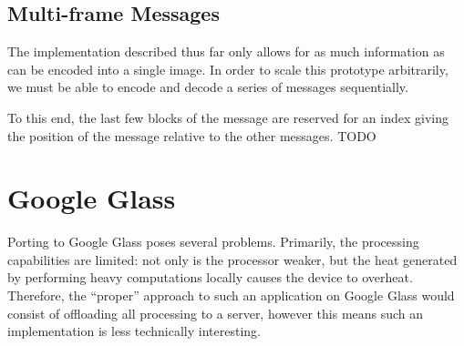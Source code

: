 \documentclass[11pt, letterpaper]{article}
\begin{document}
\subsection{Multi-frame Messages}
The implementation described thus far only allows for as much information as can be encoded into a single image.
In order to scale this prototype arbitrarily, we must be able to encode and decode a series of messages sequentially.

To this end, the last few blocks of the message are reserved for an index giving the position of the message relative to the other messages.
TODO

\section{Google Glass}
Porting to Google Glass poses several problems. Primarily, the processing capabilities are limited: not only is the processor weaker, but the heat generated by performing heavy computations locally causes the device to overheat.
Therefore, the ``proper'' approach to such an application on Google Glass would consist of offloading all processing to a server, however this means such an implementation is less technically interesting.

\printbibliography
\end{document}
